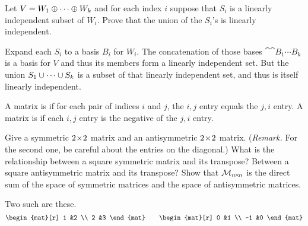 \begin{exercises}
\begin{answer}
    \end{answer}
  \item 
    Let \( V=W_1\oplus\cdots\oplus W_k \) and for each index
    \( i \) suppose that \( S_i \) is a linearly independent subset of
    \( W_i \).
    Prove that the union of the \( S_i \)'s is linearly independent.
    \begin{answer}
      Expand each \( S_i \) to a basis $B_i$ for \( W_i \).
      The concatenation of those bases $\cat{\cat{B_1}{\cdots}}{B_k}$
      is a basis for \( V \) and thus its members form a linearly independent
      set.
      But the union $S_1\cup\cdots\cup S_k$ is a subset 
      of that linearly independent set, and thus is
      itself linearly independent.  
     \end{answer}
  \item 
    A matrix is %
    if for each pair of indices \( i \) and
    \( j \), the \( i,j \) entry equals the \( j,i \) entry.
    A matrix is %
    if each \( i,j \) entry is the
    negative of the \( j,i \) entry.
    \begin{exparts}
      \partsitem Give a symmetric $2 \! \times \! 2$ matrix and an antisymmetric
        $2 \! \times \! 2$ matrix.
        (\textit{Remark.}
        For the second one, be careful about the entries on the diagonal.)
      \partsitem What is the relationship between a square symmetric matrix and
        its transpose?
        Between a square antisymmetric matrix and its transpose?
      \partsitem Show that \( \mathcal{M}_{n \! \times \! n} \) is the direct sum of 
        the space of symmetric matrices and the space of antisymmetric 
        matrices.
    \end{exparts}
    \begin{answer}
      \begin{exparts}
        \partsitem Two such are these.
          \begin{equation*}
            \begin{mat}[r]
              1  &2  \\
              2  &3
            \end{mat}
            \qquad
            \begin{mat}[r]
              0  &1  \\
              -1 &0
            \end{mat}
          \end{equation*}

\end{exparts}
\end{answer}
\end{exercises}
